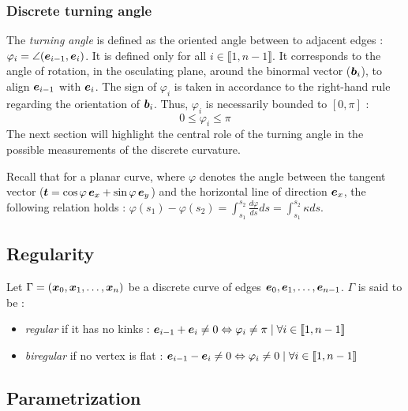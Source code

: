 \subsubsection{Discrete turning angle}
The \emph{turning angle} is defined as the oriented angle between to adjacent edges : $\varphi_i=\angle(\boldsymbol{e}_{i-1},\boldsymbol{e}_i)$. It is defined only for all $i \in \llbracket1,n-1\rrbracket$. It corresponds to the angle of rotation, in the osculating plane, around the binormal vector ($\boldsymbol{b}_i$), to align $\boldsymbol{e}_{i-1}$ with $\boldsymbol{e}_{i}$. The sign of $\varphi_i$ is taken in accordance to the right-hand rule regarding the orientation of $\boldsymbol{b}_i$. Thus, $\varphi_i$ is necessarily bounded to $[0,\pi]$ :
\begin{equation}
	0 \leqslant \varphi_i \leqslant \pi
\end{equation}
The next section will highlight the central role of the turning angle in the possible measurements of the discrete curvature.

Recall that for a planar curve, where $\varphi$ denotes the angle between the tangent vector ($\boldsymbol{t} = \cos\varphi \,\boldsymbol{e}_x + \sin\varphi \,\boldsymbol{e}_y$) and the horizontal line of direction $\boldsymbol{e}_x$, the following relation holds : $\varphi(s_1) - \varphi(s_2) = \int_{s_1}^{s_2} \frac{d \varphi}{d s} ds = \int_{s_1}^{s_2} \kappa ds$.

\subsection{Regularity}

Let $\Gamma = (\boldsymbol{x}_0,  \boldsymbol{x}_1, \ldots, \boldsymbol{x}_n)$ be a discrete curve of edges $\boldsymbol{e}_0,  \boldsymbol{e}_1, \ldots, \boldsymbol{e}_{n-1}$. $\Gamma$ is said to be :
\begin{itemize}
	\item  \emph{regular} if it has no kinks : $\boldsymbol{e}_{i-1} + \boldsymbol{e}_{i} \neq 0 \Leftrightarrow \varphi_i \neq \pi \; | \; \forall i \in \llbracket 1,n-1 \rrbracket $
	\item  \emph{biregular} if no vertex is flat : $\boldsymbol{e}_{i-1} - \boldsymbol{e}_{i} \neq 0 \Leftrightarrow \varphi_i \neq 0 \; | \; \forall i \in \llbracket 1,n-1 \rrbracket $
\end{itemize}

\subsection{Parametrization}

